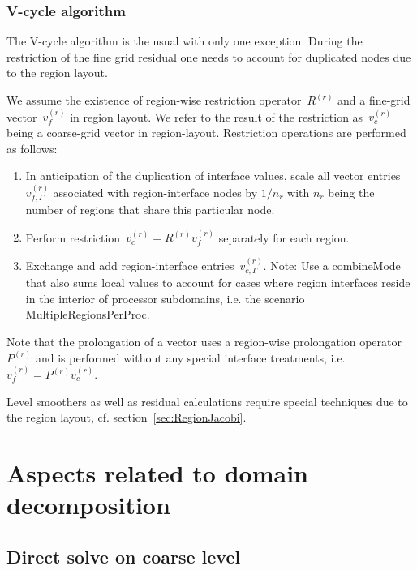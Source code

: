 \documentclass[11pt]{article}
\begin{document}
\subsubsection{V-cycle algorithm}

The V-cycle algorithm is the usual with only one exception: 
During the restriction of the fine grid residual one needs to account for duplicated nodes due to the region layout.

We assume the existence of region-wise restriction operator~$R^{(r)}$ and a fine-grid vector~$v^{(r)}_f$ in region layout. 
We refer to the result of the restriction as~$v^{(r)}_c$ being a coarse-grid vector in region-layout.
Restriction operations are performed as follows:
\begin{enumerate}
\item In anticipation of the duplication of interface values, scale all vector entries~$v^{(r)}_{f,\Gamma}$ 
associated with region-interface nodes by $1/n_r$ with $n_r$ being the number of regions that share this particular node.
\item Perform restriction~$v^{(r)}_c = R^{(r)} v^{(r)}_f$ separately for each region.
\item Exchange and add region-interface entries~$v^{(r)}_{c,\Gamma}$. Note: Use a {\sf combineMode} that also sums local values to account for cases where region interfaces reside in the interior of processor subdomains, i.e. the scenario {\sf MultipleRegionsPerProc}.
\end{enumerate}

Note that the prolongation of a vector uses a region-wise prolongation operator~$P^{(r)}$ 
and is performed without any special interface treatments, i.e. $v^{(r)}_f = P^{(r)}v^{(r)}_c$.

Level smoothers as well as residual calculations require special techniques due to the region layout, cf. section~\ref{sec:RegionJacobi}.

\section{Aspects related to domain decomposition}

\subsection{Direct solve on coarse level}
\end{document}
